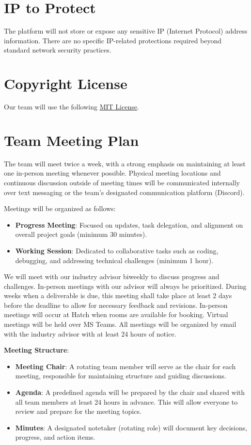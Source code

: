 \documentclass{article}
\begin{document}
\section{IP to Protect}
The platform will not store or expose any sensitive IP (Internet Protocol) address information. There are no specific IP-related protections required beyond standard network security practices.

\section{Copyright License}
Our team will use the following \href{https://github.com/dcheung11/team-6-capstone-project/blob/main/LICENSE}{MIT License}.

\section{Team Meeting Plan}
The team will meet twice a week, with a strong emphasis on maintaining at least one in-person meeting whenever possible. Physical meeting locations and continuous discussion outside of meeting times will be communicated internally over text messaging or the team’s designated communication platform (Discord).

Meetings will be organized as follows:

\begin{itemize}
  \item \textbf{Progress Meeting}: Focused on updates, task delegation, and alignment on overall project goals (minimum 30 minutes).
  \item \textbf{Working Session}: Dedicated to collaborative tasks such as coding, debugging, and addressing technical challenges (minimum 1 hour).
\end{itemize}

We will meet with our industry advisor biweekly to discuss progress and challenges. In-person meetings with our advisor will always be prioritized. During weeks when a deliverable is due, this meeting shall take place at least 2 days before the deadline to allow for necessary feedback and revisions. In-person meetings will occur at Hatch when rooms are available for booking. Virtual meetings will be held over MS Teams. All meetings will be organized by email with the industry advisor with at least 24 hours of notice.

\textbf{Meeting Structure}:
\begin{itemize}
  \item \textbf{Meeting Chair}: A rotating team member will serve as the chair for each meeting, responsible for maintaining structure and guiding discussions.
  \item \textbf{Agenda}: A predefined agenda will be prepared by the chair and shared with all team members at least 24 hours in advance. This will allow everyone to review and prepare for the meeting topics.
  \item \textbf{Minutes}: A designated notetaker (rotating role) will document key decisions, progress, and action items.
\end{itemize}
\end{document}

